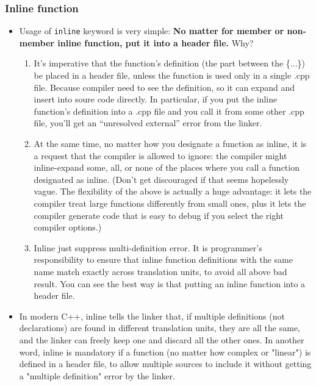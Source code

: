 \documentclass[a4paper,11pt,twoside]{book}
\begin{document}
\subsubsection{Inline function}
\begin{itemize}
	\item Usage of \texttt{inline} keyword is very simple: \textbf{No matter for member or non-member inline function, put it into a header file.} Why? 
\begin{enumerate}
	\item It’s imperative that the function’s definition (the part between the \{...\}) be placed in a header file, unless the function is used only in a single .cpp file. Because compiler need to see the definition, so it can expand and insert into soure code directly. In particular, if you put the inline function’s definition into a .cpp file and you call it from some other .cpp file, you’ll get an “unresolved external” error from the linker. 
	
	\item At the same time, no matter how you designate a function as inline, it is a request that the compiler is allowed to ignore: the compiler might inline-expand some, all, or none of the places where you call a function designated as inline. (Don’t get discouraged if that seems hopelessly vague. The flexibility of the above is actually a huge advantage: it lets the compiler treat large functions differently from small ones, plus it lets the compiler generate code that is easy to debug if you select the right compiler options.)
	
	\item Inline just suppress multi-definition error. It is programmer's responsibility to ensure that inline function definitions with the same name match exactly across translation units, to avoid all above bad result. You can see the best way is that putting an inline function into a header file.
\end{enumerate}
	
	\item In modern C++, inline tells the linker that, if multiple definitions (not declarations) are found in different translation units, they are all the same, and the linker can freely keep one and discard all the other ones. In another word, inline is mandatory if a function (no matter how complex or "linear") is defined in a header file, to allow multiple sources to include it without getting a "multiple definition" error by the linker.
	

\end{itemize}
\end{document}
